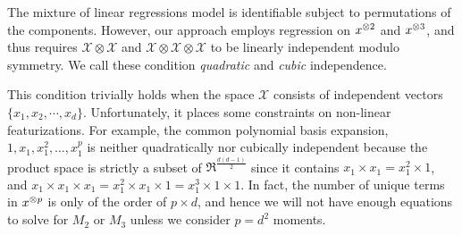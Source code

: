 The mixture of linear regressions model is identifiable subject to
permutations of the components\citationneeded. However, our approach
employs regression on $x^{\otimes 2}$ and $x^{\otimes 3}$, and thus requires
$\mathcal{X} \otimes \mathcal{X}$ and $\mathcal{X} \otimes \mathcal{X}
\otimes \mathcal{X}$ to be linearly independent modulo symmetry. We call
these condition {\em quadratic} and {\em cubic} independence.

This condition trivially holds when the space $\mathcal{X}$ consists of
independent vectors $\{ x_1, x_2, \cdots, x_d \}$. Unfortunately, it
places some constraints on non-linear featurizations. For example, the
common polynomial basis expansion, $1, x_1, x_1^2, \dots, x_1^p$ is
neither quadratically nor cubically independent because the product
space is strictly a subset of $\Re^{\frac{d (d-1)}{2}}$ since it
contains $x_1 \times x_1 = x_1^2 \times 1$, and $x_1 \times x_1 \times
x_1 = x_1^2 \times x_1 \times 1 = x_1^3 \times 1 \times 1$. In fact, the
number of unique terms in $x^{\otimes p}$ is only of the order of $p \times
d$, and hence we will not have enough equations to solve for $M_2$ or
$M_3$ unless we consider $p = d^2$ moments.




% 

